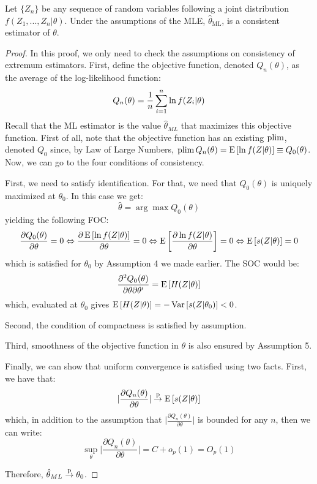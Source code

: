 \begin{theorem}
Let $\{Z_n\}$ be any sequence of random variables following a joint distribution $f(Z_1, ..., Z_n\vert \theta)$. Under the assumptions of the MLE, $\hat\theta_{\text{ML}}$, is a consistent estimator of $\theta$.
\end{theorem}
\begin{proof}
In this proof, we only need to check the assumptions on consistency of extremum estimators. First, define the objective function, denoted $Q_n(\theta)$, as the average of the log-likelihood function: $$Q_n(\theta) = \frac{1}{n} \sum_{i=1}^{n} \ln f(Z_i|\theta) $$ Recall that the ML estimator is the value $\hat\theta_{ML}$ that maximizes this objective function. First of all, note that the objective function has an existing $\operatorname{plim}$, denoted $Q_0$ since, by Law of Large Numbers, $\operatorname{plim} Q_n(\theta) = \operatorname{E}\left[\ln f(Z|\theta)\right] \equiv Q_0(\theta)$. Now, we can go to the four conditions of consistency.

First, we need to satisfy identification. For that, we need that $Q_0(\theta)$ is uniquely maximized at $\theta_0$. In this case we get: $$\hat\theta = \arg\max Q_0(\theta) $$ yielding the following FOC: $$\frac{\partial Q_0(\theta)}{\partial \theta} = 0 \Leftrightarrow \frac{\partial \operatorname{E}\left[\ln f(Z|\theta)\right]}{\partial \theta} = 0 \Leftrightarrow \operatorname{E}\left[\frac{\partial \ln f(Z|\theta)}{\partial \theta}\right] = 0 \Leftrightarrow \operatorname{E}\left[s(Z|\theta)\right] = 0 $$ which is satisfied for $\theta_0$ by Assumption 4 we made earlier. The SOC would be: $$\frac{\partial^2 Q_0(\theta)}{\partial \theta\partial \theta'} = \operatorname{E}\left[H(Z|\theta)\right] $$ which, evaluated at $\theta_0$ gives $\operatorname{E}\left[H(Z|\theta)\right] = -\operatorname{Var}\left[s(Z|\theta_0)\right] < 0$.

Second, the condition of compactness is satisfied by assumption.

Third, smoothness of the objective function in $\theta$ is also ensured by Assumption 5.

Finally, we can show that uniform convergence is satisfied using two facts. First, we have that: $$\lvert \frac{\partial Q_n(\theta)}{\partial \theta} \rvert \overset{\text{p}}{\to} \operatorname{E}\left[s(Z|\theta)\right] $$ which, in addition to the assumption that $\lvert \frac{\partial Q_n(\theta)}{\partial \theta} \rvert$ is bounded for any $n$, then we can write: $$\sup_{\theta} \lvert \frac{\partial Q_n(\theta)}{\partial \theta} \rvert = C + o_p(1) = O_p(1) $$

Therefore, $\hat\theta_{ML} \overset{\text{p}}{\to} \theta_0$.
\end{proof}

